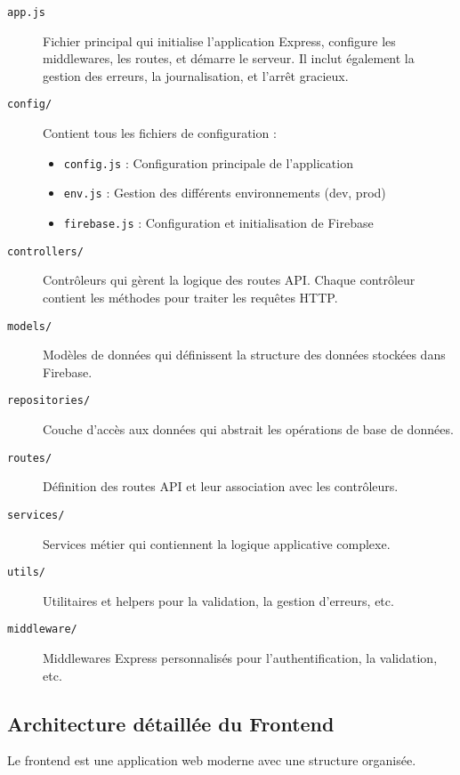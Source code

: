 \documentclass[12pt, a4paper]{article}
\begin{document}
\begin{description}
\item[\texttt{app.js}] Fichier principal qui initialise l'application Express, configure les middlewares, les routes, et démarre le serveur. Il inclut également la gestion des erreurs, la journalisation, et l'arrêt gracieux.

\item[\texttt{config/}] Contient tous les fichiers de configuration :
\begin{itemize}
\item \texttt{config.js} : Configuration principale de l'application
\item \texttt{env.js} : Gestion des différents environnements (dev, prod)
\item \texttt{firebase.js} : Configuration et initialisation de Firebase
\end{itemize}

\item[\texttt{controllers/}] Contrôleurs qui gèrent la logique des routes API. Chaque contrôleur contient les méthodes pour traiter les requêtes HTTP.

\item[\texttt{models/}] Modèles de données qui définissent la structure des données stockées dans Firebase.

\item[\texttt{repositories/}] Couche d'accès aux données qui abstrait les opérations de base de données.

\item[\texttt{routes/}] Définition des routes API et leur association avec les contrôleurs.

\item[\texttt{services/}] Services métier qui contiennent la logique applicative complexe.

\item[\texttt{utils/}] Utilitaires et helpers pour la validation, la gestion d'erreurs, etc.

\item[\texttt{middleware/}] Middlewares Express personnalisés pour l'authentification, la validation, etc.
\end{description}

\subsection{Architecture détaillée du Frontend}
Le frontend est une application web moderne avec une structure organisée.
\end{document}
